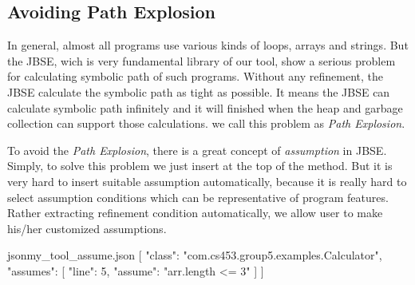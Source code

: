 \documentclass{article}
\begin{document}
\subsection{Avoiding Path Explosion}

\iffalse
언제 Path explosion이 발생하는가?
1. For, While 반복에 대한 부하가 많은경우(loop의 횟수)
2. array, String 
발생하는 문제
1. Heap이 터진다.
2. GC가 터진다.

jbse library의 method인 assume을 활용한다.
- 문제점
    - 프로그램마다 tool 자체가 적절한 loop횟수를 설정하기가 힘들다.
- 해결방안
    - 가정 -> 이건 빼도록 하겠습니다.(써놓고도 이상해서.....)
        - User(Programmer)는 자신의 프로그램에  대해서 아주 잘 알고 있다? -> 필요한 assumption을 누구보다 정확하세 파악할 수 있는 능력을 보여준다.
    - User가 customizing을 할 수 있게 허용한다.
    - (예시를 코드블록으로 보여준다.)
    - json으로 관련 정보를 받아서 자동으로 assume이 되도록 변형
- 결과?
    - 사진을 첨부를 해야하나?
- 한계 - > Limitation?
    - JBSE가 계산할 수 있는 loop의 번위가 한정적 -> coding test에서 요구하는 조건의 범위를 충족하기 매우 힘듦

\fi

In general, almost all programs use various kinds of loops, arrays and strings. But the JBSE, wich is very fundamental library of our tool, show a serious problem for calculating symbolic path of such programs. Without any refinement, the JBSE calculate the symbolic path as tight as possible. It means the JBSE can calculate symbolic path infinitely and it will finished when the heap and garbage collection can support those calculations. we call this problem as \emph{Path Explosion}.

To avoid the \emph{Path Explosion}, there is a great concept of \emph{assumption} in JBSE. Simply, to solve this problem we just insert  at the top of the method. But it is very hard to insert suitable assumption automatically, because it is really hard to select assumption conditions which can be representative of program features. Rather extracting refinement condition automatically, we allow user to make his/her customized assumptions. 

\begin{listingsbox}{json}{my\_tool\_assume.json}
[
    {
        "class": "com.cs453.group5.examples.Calculator",
        "assumes": [
            {
                "line": 5,
                "assume": "arr.length <= 3"
            }
        ]
    }
]
\end{listingsbox}
\end{document}
